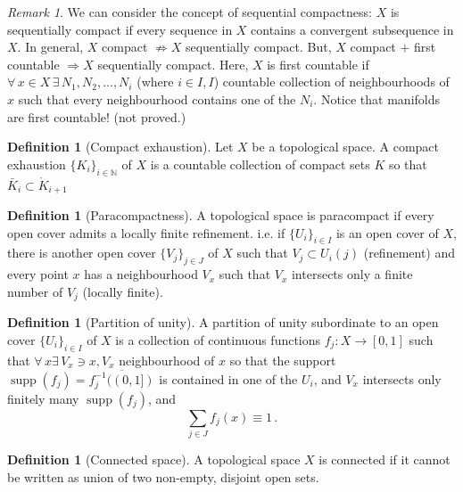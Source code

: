 \documentclass[a4paper,11pt,titlepage, article, oneside]{memoir}
\numberwithin{equation}{section}
\theoremstyle{definition}
\newtheorem{definition}[theorem]{Definition}
\theoremstyle{remark}
\newtheorem{remark}[theorem]{Remark}
\DeclareMathOperator{\supp}{supp}
\begin{document}
\begin{remarkbox}
\begin{remark}
We can consider the concept of sequential compactness: $X$ is sequentially compact if every sequence in $X$ contains a convergent subsequence in $X$. In general, $X$ compact $\not \Rightarrow X$ sequentially compact. But, $X$ compact $+$ first countable $\Rightarrow X$ sequentially compact. Here, $X$ is first countable if $\forall\, x \in X\, \exists \,  N_1, N_2, \ldots, N_i$ (where $i \in I, I $) countable collection of neighbourhoods of $x$ such that every neighbourhood contains one of the $N_i$. Notice that manifolds are first countable! (not proved.)
\end{remark}
\end{remarkbox}

\begin{definition}[Compact exhaustion]
Let $X$ be a topological space. A compact exhaustion $\{K_i\}_{i \in \mathbb{N}}$ of $X$ is a countable collection of compact sets $K$ so that $\bar K_i \subset \mathring K_{i+1}$
\end{definition}

\begin{definition}[Paracompactness] \label{paracompactness}
A topological space is paracompact if  every open cover admits a locally finite refinement. i.e. if $\{U_i\}_{i \in I}$ is an open cover of $X$, there is another open cover $\{V_j\}_{j \in J}$ of $X$ such that $V_j \subset U_i(j)$ (refinement) and every point $x$ has a neighbourhood $V_x$ such that $V_x$ intersects only a finite number of $V_j$ (locally finite).
\end{definition}

\begin{definition}[Partition of unity]
A partition of unity subordinate to an open cover $\{U_i\}_{i \in I}$ of $X$ is a collection of continuous functions $f_j \colon X \rightarrow [0, 1]$ such that $\forall \, x \exists \, V_x \ni x, V_x$ neighbourhood of $x$ so that the support $\supp(f_j) = \overline{f_j^{-1}((0, 1])}$ is contained in one of the $U_i$, and $V_x$ intersects only finitely many $\supp(f_j)$, and
$$\sum\limits_{j \in J}f_j(x) \equiv 1 \, .$$
\end{definition}

\begin{definition}[Connected space]\label{connspace}
A topological space $X$ is connected if it cannot be written as union of two non-empty, disjoint open sets.
\end{definition}
\end{document}
